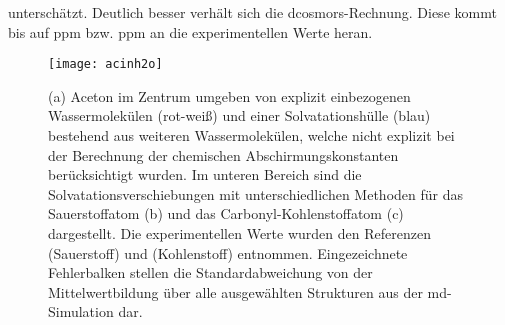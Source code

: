 unterschätzt. Deutlich besser verhält sich die \ac{dcosmors}-Rechnung. Diese kommt bis auf \unit[9]{ppm} bzw. \unit[3]{ppm} an die experimentellen Werte heran. 
	\begin{figure}[ht!]
	\centering
	\texttt{[image: acinh2o]}
	\captionsetup{figurewithin = chapter}
	\captionsetup{font=small, labelfont=bf}\caption[Solvatationseffekte für Aceton in Wasser]{\textsf{(a)} Aceton im Zentrum umgeben von explizit einbezogenen Wassermolekülen (rot-weiß) und einer Solvatationshülle (blau) bestehend aus weiteren Wassermolekülen, welche nicht explizit bei der Berechnung der chemischen Abschirmungskonstanten berücksichtigt wurden. Im unteren Bereich sind die Solvatationsverschiebungen mit unterschiedlichen Methoden für das Sauerstoffatom \textsf{(b)} und das Carbonyl-Kohlenstoffatom \textsf{(c)} dargestellt. Die experimentellen Werte wurden den Referenzen \cite{cossi2003different} (Sauerstoff) und \cite{tiffon1978effet} (Kohlenstoff) entnommen. Eingezeichnete Fehlerbalken stellen die Standardabweichung von der Mittelwertbildung über alle ausgewählten Strukturen aus der \ac{md}-Simulation dar.}
\label{abb:acinh2o}
\end{figure}
\FloatBarrier
